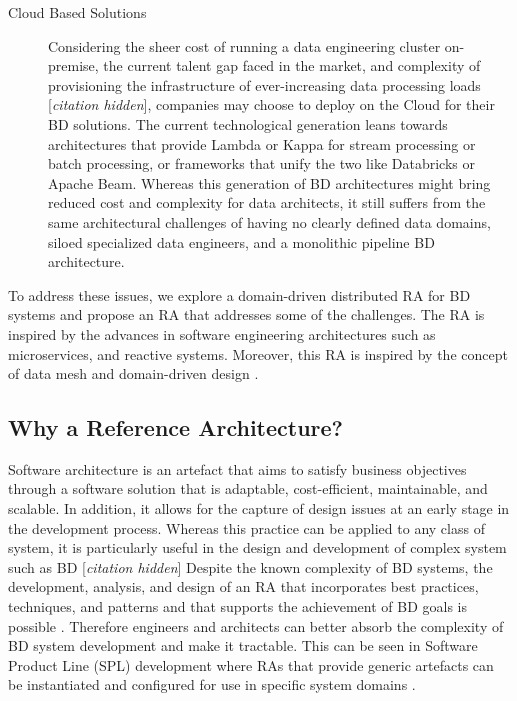 \documentclass[a4paper,11pt]{article}
\let\cite\citep
\newcommand{\hc}{[\textit{citation hidden}]\textnormal{}}
\begin{document}
\begin{description}
    \item[Cloud Based Solutions] Considering the sheer cost of running a data engineering cluster on-premise, the current talent gap faced in the market, and complexity of provisioning the infrastructure of ever-increasing data processing loads 
    \hc{},
     companies may choose to deploy on the Cloud for their BD solutions. The current technological generation leans towards architectures that provide Lambda or Kappa for stream processing or batch processing, or frameworks that unify the two like Databricks or Apache Beam. Whereas this generation of BD architectures might bring reduced cost and complexity for data architects, it still suffers from the same architectural challenges of having no clearly defined data domains, siloed specialized data engineers, and a monolithic pipeline BD architecture.
\end{description}

To address these issues, we explore a domain-driven distributed RA for BD systems and propose an RA that addresses some of the challenges. The RA is inspired by the advances in software engineering architectures such as microservices, and reactive systems. Moreover, this RA is inspired by the concept of data mesh \citep{dataMeshBook} and domain-driven design \citep{evans2004domain}.


\subsection{Why a Reference Architecture?}
Software architecture is an artefact that aims to satisfy business objectives through a software solution that is adaptable, cost-efficient, maintainable, and scalable. In addition, it allows for the capture of design issues at an early stage in the development process. Whereas this practice can be applied to any class of system, it is particularly useful in the design and development of complex system such as BD 
\hc{}
 Despite the known complexity of BD systems, the development, analysis, and design of an RA that incorporates best practices, techniques, and patterns and that supports the achievement of BD goals is possible \cite{ataei2022state}. Therefore engineers and architects can better absorb the complexity of BD system development and make it tractable. This can be seen in Software Product Line (SPL) development where RAs that provide generic artefacts can be instantiated and configured for use in specific system domains \cite{Derras,Cloutier}.
\end{document}
